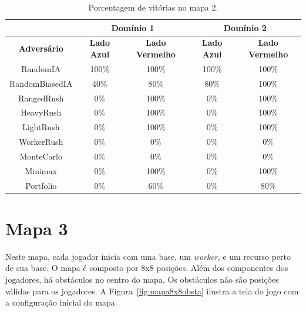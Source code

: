 \begin{table}[ht]
	\centering
	\caption{Porcentagem de vitórias no mapa 2.}
	\label{tab:mapa2}
	\begin{tabular}{|c|cc|cc|}
		\hline
		\textbf{}           & \multicolumn{2}{c|}{\textbf{Domínio 1}}  & \multicolumn{2}{c|}{\textbf{Domínio 2}}  \\ \hline
		\textbf{Adversário} & \textbf{Lado Azul} & \textbf{Lado Vermelho} & \textbf{Lado Azul} & \textbf{Lado Vermelho} \\ \hline
		RandomIA            & 100\%              & 100\%                  & 100\%              & 100\%                  \\ \hline
		RandomBiasedIA      & 40\%               & 80\%                   & 80\%               & 100\%                  \\ \hline
		RangedRush          & 0\%                & 100\%                  & 0\%                & 100\%                  \\ \hline
		HeavyRush           & 0\%                & 100\%                  & 0\%                & 100\%                  \\ \hline
		LightRush           & 0\%                & 100\%                  & 0\%                & 100\%                  \\ \hline
		WorkerRush          & 0\%                & 0\%                    & 0\%                & 0\%                    \\ \hline
		MonteCarlo          & 0\%                & 0\%                    & 0\%                & 0\%                    \\ \hline
		Minimax             & 0\%                & 100\%                  & 0\%                & 100\%                  \\ \hline
		Portfolio           & 0\%                & 60\%                  & 0\%                & 80\%                  \\ \hline
	\end{tabular}
\end{table}

\section{Mapa 3}

Neste mapa, cada jogador inicia com uma base, um \textit{worker}, e um recurso perto de sua base.
O mapa é composto por 8x8 posições.
Além dos componentes dos jogadores, há obstáculos no centro do mapa.
Os obstáculos não são posições válidas para os jogadores.
A Figura~\ref{fig:mapa8x8obsta} ilustra a tela do jogo com a configuração inicial do mapa.

